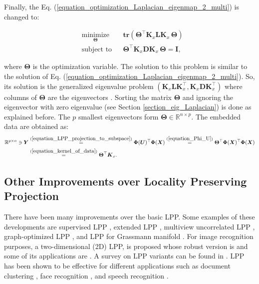\documentclass[lang=cn,10pt]{gorgeousnbook}
\numberwithin{equation}{section}%
\numberwithin{figure}{section}%
\begin{document}
Finally, the Eq. (\ref{equation_optimization_Laplacian_eigenmap_2_multi}) is changed to:

\begin{equation}\label{equation_optimization_LPP_kernel}
\begin{aligned}
& \underset{\boldsymbol{\Theta}}{\text{minimize}}
& & \textbf{tr}(\boldsymbol{\Theta}^\top \boldsymbol{K}_x \boldsymbol{L} \boldsymbol{K}_x\, \boldsymbol{\Theta}) \\
& \text{subject to}
& & 
\boldsymbol{\Theta}^\top \boldsymbol{K}_x \boldsymbol{D} \boldsymbol{K}_x\, \boldsymbol{\Theta} = \boldsymbol{I},
\end{aligned}
\end{equation}

where $\boldsymbol{\Theta}$ is the optimization variable. 
The solution to this problem is similar to the solution of Eq. (\ref{equation_optimization_Laplacian_eigenmap_2_multi}). So, its solution is the generalized eigenvalue problem $(\boldsymbol{K}_x \boldsymbol{L} \boldsymbol{K}_x^\top, \boldsymbol{K}_x \boldsymbol{D} \boldsymbol{K}_x^\top)$ where columns of $\boldsymbol{\Theta}$ are the eigenvectors \cite{ghojogh2019eigenvalue}. 
Sorting the matrix $\boldsymbol{\Theta}$ and ignoring the eigenvector with zero eigenvalue (see Section \ref{section_eig_Laplacian}) is done as explained before. The $p$ smallest eigenvectors form $\boldsymbol{\Theta} \in \mathbb{R}^{n \times p}$. 
The embedded data are obtained as:
\begin{align}
\mathbb{R}^{p \times n} \ni \boldsymbol{Y} &\overset{(\ref{equation_LPP_projection_to_subspace})}{=} \boldsymbol{\Phi}(\boldsymbol{U})^\top \boldsymbol{\Phi}(\boldsymbol{X}) \overset{(\ref{equation_Phi_U})}{=} \boldsymbol{\Theta}^\top \boldsymbol{\Phi}(\boldsymbol{X})^\top \boldsymbol{\Phi}(\boldsymbol{X}) \nonumber \\
&\overset{(\ref{equation_kernel_of_data})}{=} \boldsymbol{\Theta}^\top \boldsymbol{K}_x. \label{equation_kernel_LPP_embedding}
\end{align}


\subsection{Other Improvements over Locality Preserving Projection}

There have been many improvements over the basic LPP. Some examples of these developments are supervised LPP \cite{wong2012supervised}, extended LPP \cite{shikkenawis2012improving}, multiview uncorrelated LPP \cite{yin2019multiview}, graph-optimized LPP \cite{zhang2010graph}, and LPP for Grassmann manifold \cite{wang2017locality}. 
For image recognition purposes, a two-dimensional (2D) LPP, \cite{chen20072d} is proposed whose robust version is \cite{chen20192drlpp} and some of its applications are \cite{hu2007two,xu2009one}.
A survey on LPP variants can be found in \cite{shikkenawis2016some}. 
LPP has been shown to be effective for different applications such as document clustering \cite{cai2005document}, face recognition \cite{he2003learning,yu2006face,yang2017discriminant}, and speech recognition \cite{tang2008study}. 
\end{document}
